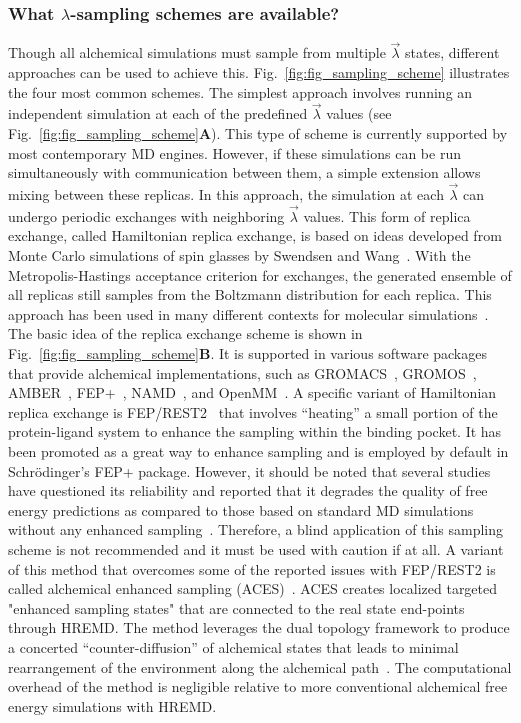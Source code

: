 \documentclass[9pt,bestpractices]{livecoms}
\begin{document}
\subsubsection{What $\lambda$-sampling schemes are available?}
\label{sec:sampling_schemes}
Though all alchemical simulations must sample from multiple $\vec{\lambda}$ states, different approaches can be used to achieve this. Fig.~\ref{fig:fig_sampling_scheme} illustrates the four most common schemes. The simplest approach involves running an independent simulation at each of the predefined $\vec{\lambda}$ values (see Fig.~\ref{fig:fig_sampling_scheme}\textbf{A}). This type of scheme is currently supported by most contemporary MD engines. However, if these simulations can be run simultaneously with communication between them, a simple extension allows mixing between these replicas. In this approach, the simulation at each $\vec{\lambda}$ can undergo periodic exchanges with neighboring $\vec{\lambda}$ values. This form of replica exchange, called Hamiltonian replica exchange, is based on ideas developed from Monte Carlo simulations of spin glasses by Swendsen and Wang~\cite{swendsen1986replica}. With the Metropolis-Hastings acceptance criterion for exchanges, the generated ensemble of all replicas still samples from the Boltzmann distribution for each replica. This approach has been used in many different contexts for molecular simulations~\cite{sugita2000multidimensional,sugita1999replicaexchange, woods2003development, jiang2010free}. The basic idea of the replica exchange scheme is shown in Fig.~\ref{fig:fig_sampling_scheme}\textbf{B}. It is supported in various software packages that provide alchemical implementations, such as GROMACS~\cite{aldeghi2015accurate}, GROMOS~\cite{hritz2008hamiltonian,hritz2007optimization},
AMBER~\cite{Lee_JChemInfModel_2020_v60_p5595}, FEP+~\cite{wang2015accurate}, NAMD~\cite{jiang2019computing}, and OpenMM~\cite{rufa2020chemical,azimi2022relative}.
A specific variant of Hamiltonian replica exchange is FEP/REST2~\cite{rest2, feprest} that involves ``heating'' a small portion of the protein-ligand system to enhance the sampling within the binding pocket. It has been promoted as a great way to enhance sampling and is employed by default in Schr\"{o}dinger's FEP+ package. However, it should be noted that several studies have questioned its reliability and reported that it degrades the quality of free energy predictions as compared to those based on standard MD simulations without any enhanced sampling~\cite{wan2020fep+, bhati2022}. Therefore, a blind application of this sampling scheme is not recommended and it must be used with caution if at all. A variant of this method that overcomes some of the reported issues with FEP/REST2 is called alchemical enhanced sampling (ACES)~\cite{lee2023aces}. ACES creates localized targeted "enhanced sampling states" that are connected to the real state end-points through HREMD.  The method leverages the dual topology framework to produce a concerted “counter-diffusion” of alchemical states that leads to minimal rearrangement of the environment along the alchemical path~\cite{York_ACSPhysChemAu_2023_v3_p478}. The computational overhead of the method is negligible relative to more conventional alchemical free energy simulations with HREMD.
\end{document}
